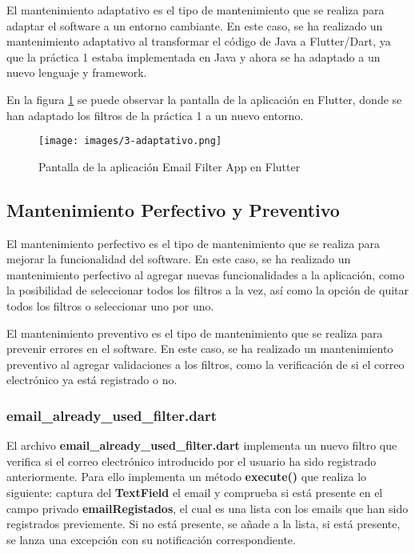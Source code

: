 \documentclass[12pt]{article}
\begin{document}
El mantenimiento adaptativo es el tipo de mantenimiento que se realiza para adaptar el software a un entorno cambiante. En este caso, se ha realizado un mantenimiento adaptativo al transformar el código de Java a Flutter/Dart, ya que la práctica 1 estaba implementada en Java y ahora se ha adaptado a un nuevo lenguaje y framework.

En la figura \ref{fig:3-adaptativo} se puede observar la pantalla de la aplicación en Flutter, donde se han adaptado los filtros de la práctica 1 a un nuevo entorno.

\begin{figure}[H]
    \centering
    \texttt{[image: images/3-adaptativo.png]}
    \caption{Pantalla de la aplicación Email Filter App en Flutter}
    \label{fig:3-adaptativo}
\end{figure}

\subsection{Mantenimiento Perfectivo y Preventivo}

El mantenimiento perfectivo es el tipo de mantenimiento que se realiza para mejorar la funcionalidad del software. En este caso, se ha realizado un mantenimiento perfectivo al agregar nuevas funcionalidades a la aplicación, como la posibilidad de seleccionar todos los filtros a la vez, así como la opción de quitar todos los filtros o seleccionar uno por uno.

El mantenimiento preventivo es el tipo de mantenimiento que se realiza para prevenir errores en el software. En este caso, se ha realizado un mantenimiento preventivo al agregar validaciones a los filtros, como la verificación de si el correo electrónico ya está registrado o no.

\subsubsection{email\_already\_used\_filter.dart}

El archivo \textbf{email\_already\_used\_filter.dart} implementa un nuevo filtro que verifica si el correo electrónico introducido por el usuario ha sido registrado anteriormente. Para ello implementa un método \textbf{execute()} que realiza lo siguiente:
captura del \textbf{TextField} el email y comprueba si está presente en el campo privado \textbf{emailRegistados}, el cual es una lista con los emails que han sido registrados previemente. Si no está presente, se añade a la lista, si está presente, se lanza una excepción con su notificación correspondiente.
\end{document}
